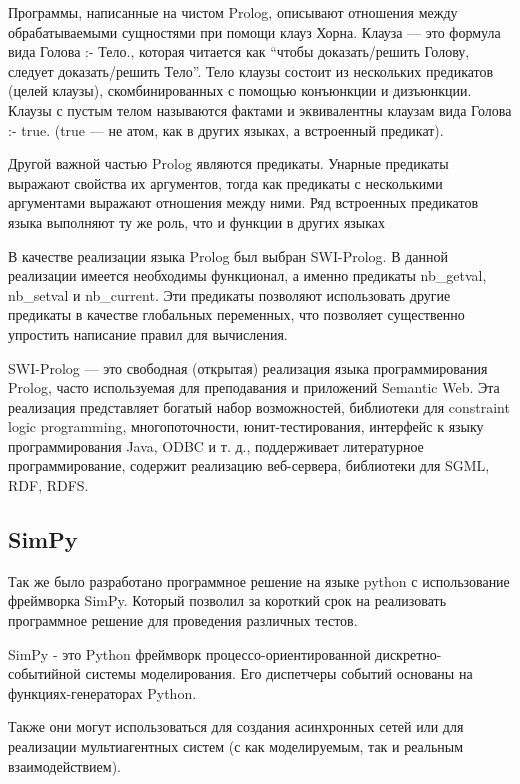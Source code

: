 		Программы, написанные на чистом Prolog, описывают отношения между обрабатываемыми сущностями при помощи клауз Хорна. Клауза — это формула вида Голова :- Тело., которая читается как “чтобы доказать/решить Голову, следует доказать/решить Тело”. Тело клаузы состоит из нескольких предикатов (целей клаузы), скомбинированных с помощью конъюнкции и дизъюнкции. Клаузы с пустым телом называются фактами и эквивалентны клаузам вида Голова :- true. (true — не атом, как в других языках, а встроенный предикат).

		Другой важной частью Prolog являются предикаты. Унарные предикаты выражают свойства их аргументов, тогда как предикаты с несколькими аргументами выражают отношения между ними. Ряд встроенных предикатов языка выполняют ту же роль, что и функции в других языках

		В качестве реализации языка Prolog был выбран SWI-Prolog.
			В данной реализации имеется необходимы функционал, а именно предикаты nb\_getval, nb\_setval и nb\_current.
			Эти предикаты позволяют использовать другие предикаты в качестве глобальных переменных, что
			позволяет существенно упростить написание правил для вычисления.

		SWI-Prolog — это свободная (открытая) реализация языка программирования \\ Prolog, часто используемая для преподавания и приложений Semantic Web. Эта реализация представляет богатый набор возможностей, библиотеки для constraint logic programming, многопоточности, юнит-тестирования, интерфейс к языку программирования Java, ODBC и т. д., поддерживает литературное программирование, содержит реализацию веб-сервера, библиотеки для SGML, RDF, RDFS.

\subsection{SimPy}

	Так же было разработано программное решение на языке python с использование фреймворка SimPy.
		Который позволил за короткий срок на реализовать программное решение для проведения различных тестов.  

	SimPy - это Python фреймворк процессо-ориентированной дискретно-событийной системы моделирования. Его диспетчеры событий основаны на функциях-генераторах Python.

	Также они могут использоваться для создания асинхронных сетей или для реализации мультиагентных систем (с как моделируемым, так и реальным взаимодействием).

